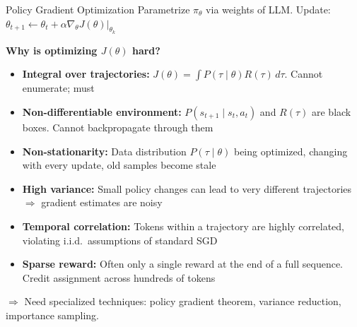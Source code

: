 \begin{frame}{Policy Gradient Optimization}
  Parametrize $\pi_\theta$ via weights of LLM. Update: $\theta_{t+1} \leftarrow \theta_t + \alpha \nabla_\theta J(\theta)\big|_{\theta_k}$

  \vspace{0.3em}
  \textbf{Why is optimizing $J(\theta)$ hard?}
  \begin{itemize}
    \item \textbf{Integral over trajectories:} $J(\theta) = \int P(\tau \mid \theta) R(\tau)\, d\tau$. Cannot enumerate; must 
    \item \textbf{Non-differentiable environment:} $P(s_{t+1} \mid s_t, a_t)$ and $R(\tau)$ are black boxes. Cannot backpropagate through them
    \item \textbf{Non-stationarity:} Data distribution $P(\tau \mid \theta)$  being optimized, changing with every update, old samples become stale
    \item \textbf{High variance:} Small policy changes can lead to very different trajectories $\Rightarrow$ gradient estimates are noisy
    \item \textbf{Temporal correlation:} Tokens within a trajectory are highly correlated, violating i.i.d.\ assumptions of standard SGD
    \item \textbf{Sparse reward:} Often only a single reward at the end of a full sequence. Credit assignment across hundreds of tokens
  \end{itemize}

  \vspace{0.3em}
  $\Rightarrow$ Need specialized techniques: policy gradient theorem, variance reduction, importance sampling.
\end{frame}

